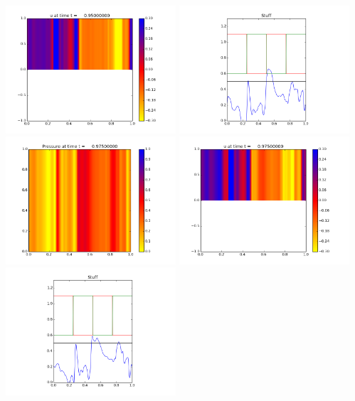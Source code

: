 \documentclass[11pt]{article}
\begin{document}
\includegraphics[width=0.475\textwidth]{frame0038fig1.png}
\vskip 10pt 
\includegraphics[width=0.475\textwidth]{frame0038fig3.png}
\vskip 10pt 
\includegraphics[width=0.475\textwidth]{frame0039fig0.png}
\includegraphics[width=0.475\textwidth]{frame0039fig1.png}
\vskip 10pt 
\includegraphics[width=0.475\textwidth]{frame0039fig3.png}
\end{document}
